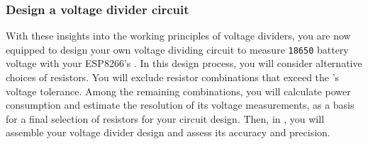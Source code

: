 \subsubsection{\howto Design a voltage divider circuit}
With these insights into the working principles of voltage dividers, you are now equipped to design your own voltage dividing circuit to measure \texttt{18650} battery voltage with your ESP8266's \adc. 
In this design process, you will consider alternative choices of resistors.
You will exclude resistor combinations that exceed the \adc's voltage tolerance.
Among the remaining combinations, you will calculate power consumption and estimate the resolution %
of its voltage measurements, as a basis for a final selection of resistors for your circuit design. 
Then, in , you will assemble your voltage divider design and assess its accuracy and precision. 
